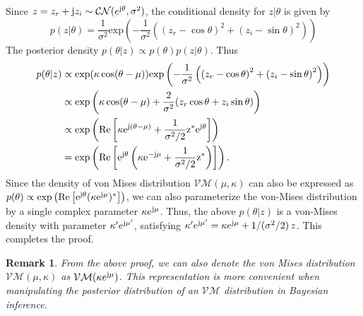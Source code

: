\documentclass[12pt,draftclsnofoot,journal,onecolumn]{IEEEtran}
\newtheorem{remark}{\bf Remark}
\theoremstyle{nonumberplain}
\def \exp {\text{exp}}
\def \CN {\mathcal{CN}}
\def \VM {\mathcal{VM}}
\def \re {\rm Re}
\begin{document}
    \begin{IEEEproof}
        Since $z=z_r + {\rm j} z_i \sim \CN(e^{{\rm j} \theta}, \sigma^2)$, the conditional density for $z|\theta$ is given by 
        \begin{equation}
            p(z|\theta) = \frac{1}{\sigma^2}\exp\left(-\frac{1}{\sigma^2}\left(\left(z_r - \cos\theta\right)^2 + \left(z_i - \sin\theta\right)^2\right)\right)
        \end{equation}
        The posterior density $p(\theta | z) \propto p(\theta)p(z|\theta)$. Thus
        \begin{equation}
            \begin{aligned}
                p(\theta|z) & \propto \exp(\kappa \cos(\theta - \mu))\exp\left(-\frac{1}{\sigma^2}\left(\left(z_r - \cos\theta\right)^2 + \left(z_i - \sin\theta\right)^2\right)\right) \\
                & \propto \exp\left( \kappa \cos(\theta - \mu) + \frac{2}{\sigma^2}(z_r \cos\theta + z_i\sin\theta) \right) \\
                & \propto \exp\left( \re\left[ \kappa e^{{\rm j} (\theta - \mu)} + \frac{1}{\sigma^2/2}z^{*} e^{{\rm j} \theta} \right] \right) \\
                & = \exp\left( \re\left[ e^{{\rm j} \theta}\left(\kappa e^{-{\rm j}\mu} + \frac{1}{\sigma^2/2} z^*\right)\right] \right).
            \end{aligned}
        \end{equation}
        Since the density of von Mises distribution $\VM(\mu, \kappa)$ can also be expressed as $p(\theta) \propto \exp\left( \re\left[ e^{{\rm j} \theta}(\kappa e^{{\rm j} \mu})^* \right] \right)$, we can also parameterize the von-Mises distribution by a single complex parameter $\kappa e^{{\rm j}\mu}$. Thus, the above $p(\theta|z)$ is a von-Mises density with parameter $\kappa'e^{{\rm j}\mu'}$, satisfying $\kappa' e^{{\rm j}\mu'} = \kappa e^{{\rm j}\mu} + 1/(\sigma^2/2)\,z$. This completes the proof.
    \end{IEEEproof}
    \begin{remark}
        From the above proof, we can also denote the von Mises distribution $\VM(\mu, \kappa)$ as $\VM(\kappa e^{{\rm j}\mu})$. This representation is more convenient when manipulating the posterior distribution of an $\VM$ distribution in Bayesian inference.
    \end{remark}
\end{document}
